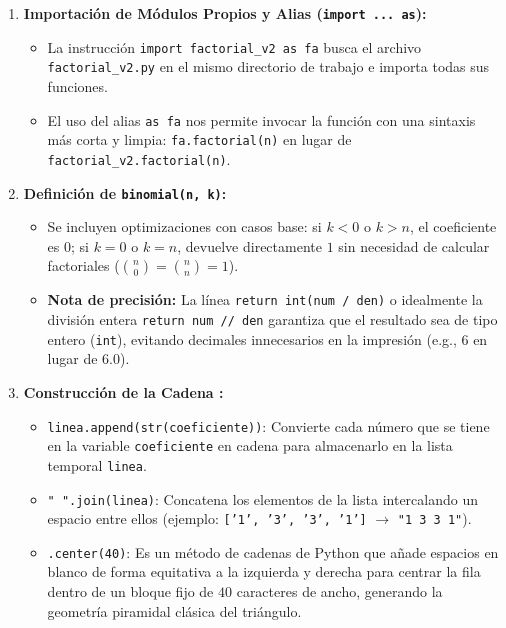 \documentclass[12pt]{article}
\begin{document}
\begin{enumerate}
    \item \textbf{Importación de Módulos Propios y Alias (\lstinline|import ... as|):}
    \begin{itemize}
        \item La instrucción \lstinline|import factorial_v2 as fa| busca el archivo \texttt{factorial\_v2.py} en el mismo directorio de trabajo e importa todas sus funciones.
        \item El uso del alias \lstinline|as fa| nos permite invocar la función con una sintaxis más corta y limpia: \lstinline|fa.factorial(n)| en lugar de \lstinline|factorial_v2.factorial(n)|.
    \end{itemize}

    \item \textbf{Definición de \lstinline|binomial(n, k)|:}
    \begin{itemize}
        \item Se incluyen optimizaciones con casos base: si $k < 0$ o $k > n$, el coeficiente es $0$; si $k = 0$ o $k = n$, devuelve directamente $1$ sin necesidad de calcular factoriales ($\binom{n}{0} = \binom{n}{n} = 1$).
        \item \textbf{Nota de precisión:} La línea \lstinline|return int(num / den)| o idealmente la división entera \lstinline|return num // den| garantiza que el resultado sea de tipo entero (\lstinline|int|), evitando decimales innecesarios en la impresión (e.g., $6$ en lugar de $6.0$).
    \end{itemize}

    \item \textbf{Construcción de la Cadena :}
    \begin{itemize}
        \item \lstinline|linea.append(str(coeficiente))|: Convierte cada número que se tiene en la variable \newline \lstinline|coeficiente|
        en cadena para almacenarlo en la lista temporal \lstinline|linea|.
        \item \lstinline|" ".join(linea)|: Concatena los elementos de la lista intercalando un espacio entre ellos (ejemplo: \texttt{['1', '3', '3', '1']} $\rightarrow$ \texttt{"1 3 3 1"}).
        \item \lstinline|.center(40)|: Es un método de cadenas de Python que añade espacios en blanco de forma equitativa a la izquierda y derecha para centrar la fila dentro de un bloque fijo de $40$ caracteres de ancho, generando la geometría piramidal clásica del triángulo.
    \end{itemize}
\end{enumerate}
\end{document}

